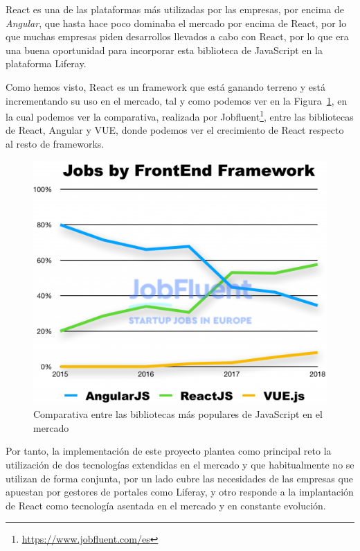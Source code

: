 \documentclass[a4paper, 12pt]{book}
\begin{document}
\vspace{5mm} %
React es una de las plataformas más utilizadas por las empresas, por encima de \textit{Angular}, que hasta hace poco dominaba el mercado por encima de React, por lo que muchas empresas piden desarrollos llevados a cabo con React, por lo que era una buena oportunidad para incorporar esta biblioteca de JavaScript en la plataforma Liferay.

\vspace{5mm} %
Como hemos visto, React es un framework que está ganando terreno y está incrementando su uso en el mercado, tal y como podemos ver en la Figura~\ref{fig:react_mercado}, en la cual podemos ver la comparativa, realizada por Jobfluent\footnote{\url{https://www.jobfluent.com/es}}, entre las bibliotecas de React, Angular y VUE, donde podemos ver el crecimiento de React respecto al resto de frameworks.
\begin{figure}[h]
  \centering
  \includegraphics{img_usadas/react_mercado.png}
  \caption{Comparativa entre las bibliotecas más populares de JavaScript en el mercado}
  \label{fig:react_mercado}
\end{figure}

\vspace{5mm}
Por tanto, la implementación de este proyecto plantea como principal reto la utilización de dos tecnologías extendidas en el mercado y que habitualmente no se utilizan de forma conjunta, por un lado cubre las necesidades de las empresas que apuestan por gestores de portales como Liferay, y otro responde a la implantación de React como tecnología asentada en el mercado y en constante evolución.
\end{document}

